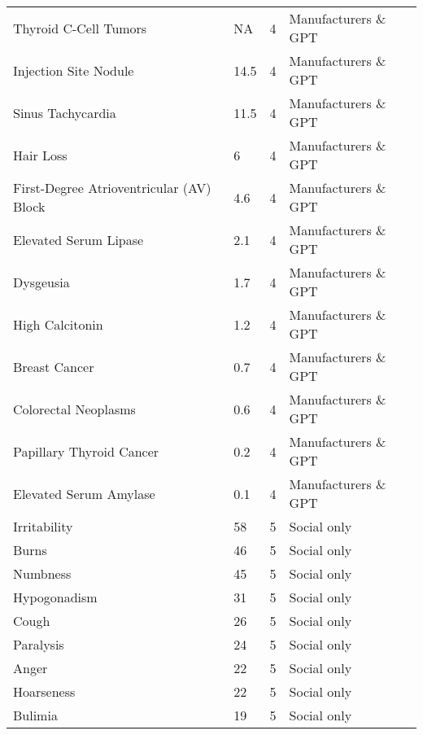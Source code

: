 \documentclass[referee,bst/sn-basic]{sn-jnl}%
\theoremstyle{thmstyletwo}%
\theoremstyle{thmstylethree}%
\begin{document}
\begin{appendices}
\begin{longtable}{llll}
Thyroid C-Cell Tumors                    & NA        & 4    & Manufacturers \& GPT    \\
Injection Site Nodule                    & 14.5      & 4    & Manufacturers \& GPT    \\
Sinus Tachycardia                        & 11.5      & 4    & Manufacturers \& GPT    \\
Hair Loss                                & 6         & 4    & Manufacturers \& GPT    \\
First-Degree Atrioventricular (AV) Block & 4.6       & 4    & Manufacturers \& GPT    \\
Elevated Serum Lipase                    & 2.1       & 4    & Manufacturers \& GPT    \\
Dysgeusia                                & 1.7       & 4    & Manufacturers \& GPT    \\
High Calcitonin                          & 1.2       & 4    & Manufacturers \& GPT    \\
Breast Cancer                            & 0.7       & 4    & Manufacturers \& GPT    \\
Colorectal Neoplasms                     & 0.6       & 4    & Manufacturers \& GPT    \\
Papillary Thyroid Cancer                 & 0.2       & 4    & Manufacturers \& GPT    \\
Elevated Serum Amylase                   & 0.1       & 4    & Manufacturers \& GPT    \\
Irritability                             & 58        & 5    & Social only             \\
Burns                                    & 46        & 5    & Social only             \\
Numbness                                 & 45        & 5    & Social only             \\
Hypogonadism                             & 31        & 5    & Social only             \\
Cough                                    & 26        & 5    & Social only             \\
Paralysis                                & 24        & 5    & Social only             \\
Anger                                    & 22        & 5    & Social only             \\
Hoarseness                               & 22        & 5    & Social only             \\
Bulimia                                  & 19        & 5    & Social only             \\

\end{longtable}
\end{appendices}
\end{document}

